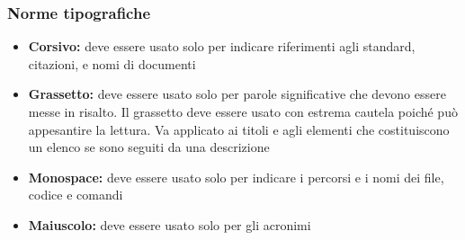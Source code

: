 \documentclass[12pt,a4paper]{article}
\begin{document}
\subsubsection{Norme tipografiche}\label{norme tipografiche}

\begin{itemize}
	\item \textbf{Corsivo:} deve essere usato solo per indicare riferimenti agli standard, citazioni,  e nomi di documenti
	\item \textbf{Grassetto:} deve essere usato solo per parole significative che devono essere messe in risalto. Il grassetto deve essere usato con estrema cautela poiché può appesantire la lettura. Va applicato ai titoli e agli elementi che costituiscono un elenco se sono seguiti da una descrizione
	\item \textbf{Monospace:} deve essere usato solo per indicare i percorsi e i nomi dei file, codice e comandi
	\item \textbf{Maiuscolo:} deve essere usato solo per gli acronimi
\end{itemize}
\end{document}
